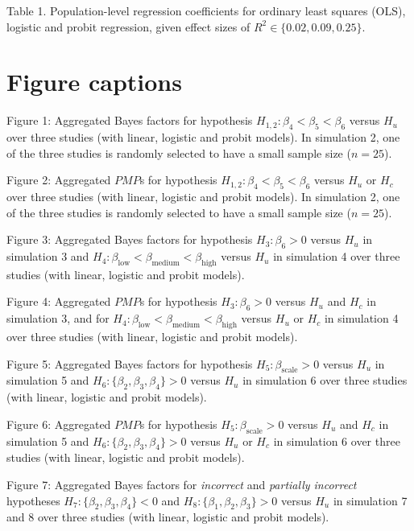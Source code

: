 \documentclass[
]{interact}
\begin{document}
Table 1. Population-level regression coefficients for ordinary least
squares (OLS), logistic and probit regression, given effect sizes of
\(R^2 \in \{0.02, 0.09, 0.25\}\).

\newpage{}

\hypertarget{figure-captions}{%
\section{Figure captions}\label{figure-captions}}

Figure 1: Aggregated Bayes factors for hypothesis
\(H_{1,2}: \beta_4 < \beta_5 < \beta_6\) versus \(H_u\) over three
studies (with linear, logistic and probit models). In simulation 2, one
of the three studies is randomly selected to have a small sample size
(\(n = 25\)).

Figure 2: Aggregated \(PMP\)s for hypothesis
\(H_{1,2}: \beta_4 < \beta_5 < \beta_6\) versus \(H_u\) or \(H_c\) over
three studies (with linear, logistic and probit models). In simulation
2, one of the three studies is randomly selected to have a small sample
size (\(n = 25\)).

Figure 3: Aggregated Bayes factors for hypothesis \(H_3: \beta_6 > 0\)
versus \(H_u\) in simulation 3 and
\(H_4: \beta_{\text{low}} < \beta_{\text{medium}} < \beta_{\text{high}}\)
versus \(H_u\) in simulation 4 over three studies (with linear, logistic
and probit models).

Figure 4: Aggregated \(PMP\)s for hypothesis \(H_3: \beta_6 > 0\) versus
\(H_u\) and \(H_c\) in simulation 3, and for
\(H_4: \beta_{\text{low}} < \beta_{\text{medium}} < \beta_{\text{high}}\)
versus \(H_u\) or \(H_c\) in simulation 4 over three studies (with
linear, logistic and probit models).

Figure 5: Aggregated Bayes factors for hypothesis
\(H_5: \beta_{\text{scale}} > 0\) versus \(H_u\) in simulation 5 and
\(H_6: \{\beta_2, \beta_3, \beta_4\} > 0\) versus \(H_u\) in simulation
6 over three studies (with linear, logistic and probit models).

Figure 6: Aggregated \(PMP\)s for hypothesis
\(H_5: \beta_{\text{scale}} > 0\) versus \(H_u\) and \(H_c\) in
simulation 5 and \(H_6: \{\beta_2, \beta_3, \beta_4\} > 0\) versus
\(H_u\) or \(H_c\) in simulation 6 over three studies (with linear,
logistic and probit models).

Figure 7: Aggregated Bayes factors for \textit{incorrect} and
\textit{partially incorrect} hypotheses
\(H_7: \{\beta_2, \beta_3, \beta_4\} < 0\) and
\(H_8: \{\beta_1, \beta_2, \beta_3\} > 0\) versus \(H_u\) in simulation
7 and 8 over three studies (with linear, logistic and probit models).
\end{document}
